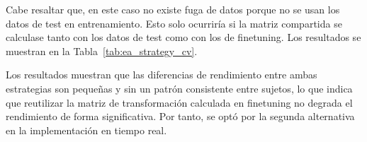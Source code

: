 Cabe resaltar que, en este caso no existe fuga de datos porque no se usan los datos de test en entrenamiento. Esto solo ocurriría si la matriz compartida se calculase tanto con los datos de test como con los de finetuning. 
Los resultados se muestran en la Tabla~\ref{tab:ea_strategy_cv}.

\begin{table}[h]
    \centering
    \caption{Accuracy medio $\pm$ desviación típica en validación cruzada (5-Fold) para cada sujeto, comparando EA con matrices independientes por conjunto frente a EA con la matriz calculada en finetuning reutilizada en test.}
    \label{tab:ea_strategy_cv}
\end{table}

Los resultados muestran que las diferencias de rendimiento entre ambas estrategias son pequeñas y sin un patrón consistente entre sujetos, lo que indica que reutilizar la matriz de transformación calculada en finetuning no degrada el rendimiento de forma significativa. Por tanto, se optó por la segunda alternativa en la implementación en tiempo real.
